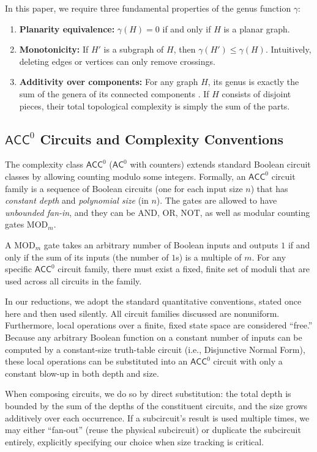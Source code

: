 \documentclass[11pt]{article}
\theoremstyle{definition}
\theoremstyle{remark}
\newcommand{\ACC}{\mathsf{ACC}^0}
\newcommand{\AC}{\mathsf{AC}^0}
\newcommand{\genus}{\gamma}
\begin{document}
In this paper, we require three fundamental properties of the genus function $\genus$:
\begin{enumerate}
    \item \textbf{Planarity equivalence:} $\genus(H) = 0$ if and only if $H$ is a planar graph.
    \item \textbf{Monotonicity:} If $H'$ is a subgraph of $H$, then $\genus(H') \le \genus(H)$. Intuitively, deleting edges or vertices can only remove crossings.
    \item \textbf{Additivity over components:} For any graph $H$, its genus is exactly the sum of the genera of its connected components \cite{BHKY62}. If $H$ consists of disjoint pieces, their total topological complexity is simply the sum of the parts.
\end{enumerate}

\subsection{\texorpdfstring{$\ACC$}{ACC0} Circuits and Complexity Conventions}

The complexity class $\ACC$ ($\AC$ with counters) extends standard Boolean circuit classes by allowing counting modulo some integers. Formally, an $\ACC$ circuit family is a sequence of Boolean circuits (one for each input size $n$) that has \emph{constant depth} and \emph{polynomial size} (in $n$). The gates are allowed to have \emph{unbounded fan-in}, and they can be $\mathrm{AND}$, $\mathrm{OR}$, $\mathrm{NOT}$, as well as modular counting gates $\mathrm{MOD}_m$.

A $\mathrm{MOD}_m$ gate takes an arbitrary number of Boolean inputs and outputs $1$ if and only if the sum of its inputs (the number of $1$s) is a multiple of $m$. For any specific $\ACC$ circuit family, there must exist a fixed, finite set of moduli that are used across all circuits in the family.

In our reductions, we adopt the standard quantitative conventions, stated once here and then used silently. All circuit families discussed are nonuniform. Furthermore, local operations over a finite, fixed state space are considered ``free.'' Because any arbitrary Boolean function on a constant number of inputs can be computed by a constant-size truth-table circuit (i.e., Disjunctive Normal Form), these local operations can be substituted into an $\ACC$ circuit with only a constant blow-up in both depth and size.

When composing circuits, we do so by direct substitution: the total depth is bounded by the sum of the depths of the constituent circuits, and the size grows additively over each occurrence. If a subcircuit's result is used multiple times, we may either ``fan-out'' (reuse the physical subcircuit) or duplicate the subcircuit entirely, explicitly specifying our choice when size tracking is critical.
\end{document}
